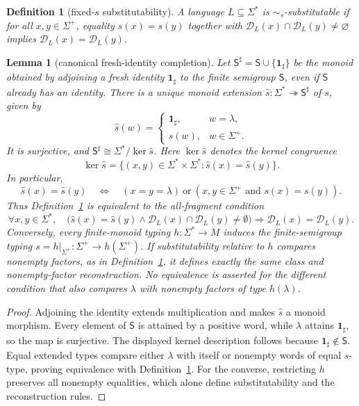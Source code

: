 \documentclass[11pt,a4paper]{article}
\newtheorem{lemma}[theorem]{Lemma}
\newtheorem{definition}[theorem]{Definition}
\theoremstyle{remark}
\theoremstyle{plain}
\newcommand{\D}{\mathcal{D}}
\begin{document}
\begin{definition}[fixed-$s$ substitutability]\label{def:hsubst}
A language $L\subseteq\Sigma^*$ is \emph{$\sim_s$-substitutable} if for all
$x,y\in\Sigma^+$, equality $s(x)=s(y)$ together with
$\D_L(x)\cap\D_L(y)\ne\varnothing$ implies $\D_L(x)=\D_L(y)$.
\end{definition}
\begin{lemma}[canonical fresh-identity completion]\label{lem:fresh-identity}
Let $\mathsf S^\sharp=\mathsf S\cup\{\mathbf{1}_{\sharp}\}$
be the monoid obtained by adjoining a \emph{fresh}
identity $\mathbf{1}_{\sharp}$ to the finite semigroup $\mathsf S$,
even if $\mathsf S$ already has an identity.
There is a unique monoid extension
$\widehat s:\Sigma^*\twoheadrightarrow\mathsf S^\sharp$
of $s$, given by
\[
\widehat s(w)=
\begin{cases}
\mathbf{1}_{\sharp},&w=\lambda,\\
s(w),&w\in\Sigma^+.
\end{cases}
\]
It is surjective, and
$\mathsf S^\sharp\cong\Sigma^*/\ker\widehat s$.
Here $\ker\widehat s$ denotes the kernel congruence
\[
\ker\widehat s
=\{(x,y)\in\Sigma^*\times\Sigma^*:
\widehat s(x)=\widehat s(y)\}.
\]
In particular,
\[
\widehat s(x)=\widehat s(y)\quad\Longleftrightarrow\quad
(x=y=\lambda)\ \text{or}\
(x,y\in\Sigma^+\text{ and }s(x)=s(y)).
\]
Thus Definition~\ref{def:hsubst} is equivalent to
the all-fragment condition
\[
\forall x,y\in\Sigma^*,\quad
\bigl(\widehat s(x)=\widehat s(y)\land
\D_L(x)\cap\D_L(y)\ne\emptyset\bigr)
\Longrightarrow\D_L(x)=\D_L(y).
\]
Conversely, every finite-monoid typing
$h:\Sigma^*\to M$ induces the finite-semigroup typing
$s=h|_{\Sigma^+}:\Sigma^+\to h(\Sigma^+)$.
If substitutability relative to $h$ compares \emph{nonempty}
factors, as in Definition~\ref{def:hsubst}, it defines
exactly the same class and nonempty-factor reconstruction.
No equivalence is asserted for the different condition that
also compares $\lambda$ with nonempty factors of type $h(\lambda)$.
\end{lemma}
\begin{proof}
Adjoining the identity extends multiplication
and makes $\widehat s$ a monoid morphism.
Every element of $\mathsf S$ is attained by a
positive word, while $\lambda$ attains $\mathbf{1}_{\sharp}$,
so the map is surjective.  The displayed
kernel description follows because
$\mathbf{1}_{\sharp}\notin\mathsf S$.
Equal extended types compare either $\lambda$
with itself or nonempty words of equal $s$-type,
proving equivalence with Definition~\ref{def:hsubst}.
For the converse, restricting $h$ preserves
all nonempty equalities, which alone define
substitutability and the reconstruction rules.
\end{proof}
\end{document}

